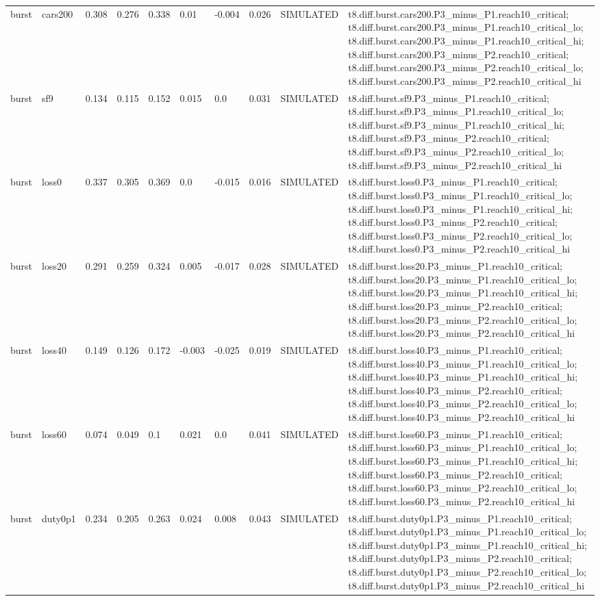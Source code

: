 \begin{table}[t]
\begin{tabular}{llllllllll}
burst & cars200 & 0.308 & 0.276 & 0.338 & 0.01 & -0.004 & 0.026 & SIMULATED & t8.diff.burst.cars200.P3\_minus\_P1.reach10\_critical; t8.diff.burst.cars200.P3\_minus\_P1.reach10\_critical\_lo; t8.diff.burst.cars200.P3\_minus\_P1.reach10\_critical\_hi; t8.diff.burst.cars200.P3\_minus\_P2.reach10\_critical; t8.diff.burst.cars200.P3\_minus\_P2.reach10\_critical\_lo; t8.diff.burst.cars200.P3\_minus\_P2.reach10\_critical\_hi \\
burst & sf9 & 0.134 & 0.115 & 0.152 & 0.015 & 0.0 & 0.031 & SIMULATED & t8.diff.burst.sf9.P3\_minus\_P1.reach10\_critical; t8.diff.burst.sf9.P3\_minus\_P1.reach10\_critical\_lo; t8.diff.burst.sf9.P3\_minus\_P1.reach10\_critical\_hi; t8.diff.burst.sf9.P3\_minus\_P2.reach10\_critical; t8.diff.burst.sf9.P3\_minus\_P2.reach10\_critical\_lo; t8.diff.burst.sf9.P3\_minus\_P2.reach10\_critical\_hi \\
burst & loss0 & 0.337 & 0.305 & 0.369 & 0.0 & -0.015 & 0.016 & SIMULATED & t8.diff.burst.loss0.P3\_minus\_P1.reach10\_critical; t8.diff.burst.loss0.P3\_minus\_P1.reach10\_critical\_lo; t8.diff.burst.loss0.P3\_minus\_P1.reach10\_critical\_hi; t8.diff.burst.loss0.P3\_minus\_P2.reach10\_critical; t8.diff.burst.loss0.P3\_minus\_P2.reach10\_critical\_lo; t8.diff.burst.loss0.P3\_minus\_P2.reach10\_critical\_hi \\
burst & loss20 & 0.291 & 0.259 & 0.324 & 0.005 & -0.017 & 0.028 & SIMULATED & t8.diff.burst.loss20.P3\_minus\_P1.reach10\_critical; t8.diff.burst.loss20.P3\_minus\_P1.reach10\_critical\_lo; t8.diff.burst.loss20.P3\_minus\_P1.reach10\_critical\_hi; t8.diff.burst.loss20.P3\_minus\_P2.reach10\_critical; t8.diff.burst.loss20.P3\_minus\_P2.reach10\_critical\_lo; t8.diff.burst.loss20.P3\_minus\_P2.reach10\_critical\_hi \\
burst & loss40 & 0.149 & 0.126 & 0.172 & -0.003 & -0.025 & 0.019 & SIMULATED & t8.diff.burst.loss40.P3\_minus\_P1.reach10\_critical; t8.diff.burst.loss40.P3\_minus\_P1.reach10\_critical\_lo; t8.diff.burst.loss40.P3\_minus\_P1.reach10\_critical\_hi; t8.diff.burst.loss40.P3\_minus\_P2.reach10\_critical; t8.diff.burst.loss40.P3\_minus\_P2.reach10\_critical\_lo; t8.diff.burst.loss40.P3\_minus\_P2.reach10\_critical\_hi \\
burst & loss60 & 0.074 & 0.049 & 0.1 & 0.021 & 0.0 & 0.041 & SIMULATED & t8.diff.burst.loss60.P3\_minus\_P1.reach10\_critical; t8.diff.burst.loss60.P3\_minus\_P1.reach10\_critical\_lo; t8.diff.burst.loss60.P3\_minus\_P1.reach10\_critical\_hi; t8.diff.burst.loss60.P3\_minus\_P2.reach10\_critical; t8.diff.burst.loss60.P3\_minus\_P2.reach10\_critical\_lo; t8.diff.burst.loss60.P3\_minus\_P2.reach10\_critical\_hi \\
burst & duty0p1 & 0.234 & 0.205 & 0.263 & 0.024 & 0.008 & 0.043 & SIMULATED & t8.diff.burst.duty0p1.P3\_minus\_P1.reach10\_critical; t8.diff.burst.duty0p1.P3\_minus\_P1.reach10\_critical\_lo; t8.diff.burst.duty0p1.P3\_minus\_P1.reach10\_critical\_hi; t8.diff.burst.duty0p1.P3\_minus\_P2.reach10\_critical; t8.diff.burst.duty0p1.P3\_minus\_P2.reach10\_critical\_lo; t8.diff.burst.duty0p1.P3\_minus\_P2.reach10\_critical\_hi \\
\bottomrule
\end{tabular}
\end{table}
